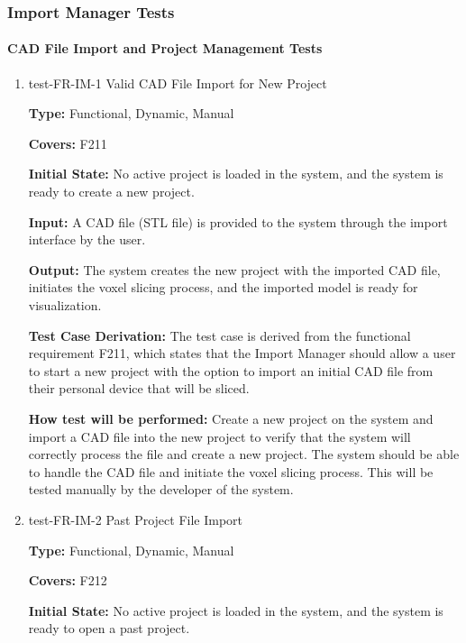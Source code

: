 \documentclass[12pt, titlepage]{article}
\begin{document}
\subsubsection{Import Manager Tests}

\paragraph{CAD File Import and Project Management Tests}

\begin{enumerate}

\item{test-FR-IM-1 Valid CAD File Import for New Project\\}

\textbf{Type:} Functional, Dynamic, Manual

\textbf{Covers:} F211
					
\textbf{Initial State:} No active project is loaded in the system, and the system is ready to create a new project.
					
\textbf{Input:} A CAD file (STL file) is provided to the system through the import interface by the user.
					
\textbf{Output:} The system creates the new project with the imported CAD file, initiates the voxel slicing process, and the imported model is ready for visualization.

\textbf{Test Case Derivation:} The test case is derived from the functional requirement F211, which states that the Import Manager should allow a user to start a new project with the option to import an initial CAD file from their personal device that will be sliced.
					
\textbf{How test will be performed:} Create a new project on the system and import a CAD file into the new project to verify that the system will correctly process the file and create a new project. The system should be able to handle the CAD file and initiate the voxel slicing process. This will be tested manually by the developer of the system.

\item{test-FR-IM-2 Past Project File Import\\}

\textbf{Type:} Functional, Dynamic, Manual

\textbf{Covers:} F212
					
\textbf{Initial State:} No active project is loaded in the system, and the system is ready to open a past project.
					

\end{enumerate}
\end{document}
